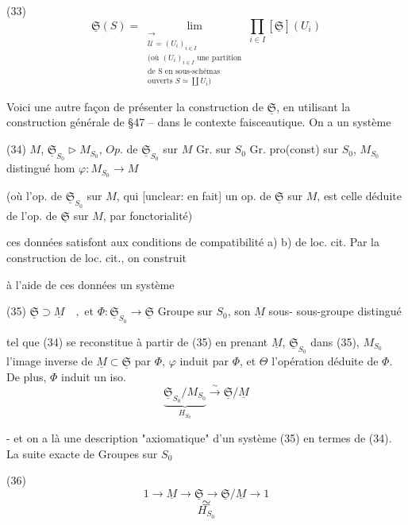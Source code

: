 (33) $$ \underline{\mathfrak{S}}(S) = \lim_{\substack{\longrightarrow \\ \mathcal{U} = (U_i)_{i \in I} \\ \text{(où } (U_i)_{i \in I} \text{ une partition} \\ \text{de S en sous-schémas} \\ \text{ouverts } S \simeq \coprod U_i)}} \prod_{i \in I} [\underline{\mathfrak{S}}](U_i) $$

Voici une autre façon de présenter la
construction de $\underline{\mathfrak{S}}$, en utilisant la
construction générale de §47 -- dans le
contexte faisceautique. On a un système

(34) $M$, $\underline{\mathfrak{S}}_{S_0} \triangleright M_{S_0}$, $Op.$ de $\underline{\mathfrak{S}}_{S_0}$ sur $M$
Gr. sur $S_0$  Gr. pro(const) sur $S_0$, $M_{S_0}$ distingué  hom $\varphi : M_{S_0} \to M$

(où l'op. de $\underline{\mathfrak{S}}_{S_0}$ sur $M$, qui [unclear: en fait]
un op. de $\underline{\mathfrak{S}}$ sur $M$, est celle déduite
de l'op. de $\underline{\mathfrak{S}}$ sur $M$, par fonctorialité)

ces données satisfont aux conditions de
compatibilité a) b) de loc. cit. Par la
construction de loc. cit., on construit

\newpage


à l'aide de ces données un système

(35) $\underline{\mathfrak{S}} \supset \underline{M} \quad , \text{ et } \Phi : \underline{\mathfrak{S}}_{S_0} \to \underline{\mathfrak{S}}$
Groupe sur $S_0$,
son $\underline{M}$ sous-
sous-groupe distingué

tel que (34) se reconstitue à partir de
(35) en prenant $\underline{M}$, $\underline{\mathfrak{S}}_{S_0}$ dans (35),
$M_{S_0}$ l'image inverse de $\underline{M} \subset \underline{\mathfrak{S}}$ par $\Phi$,
$\varphi$ induit par $\Phi$, et $\Theta$ l'opération déduite
de $\Phi$. De plus, $\Phi$ induit un iso.
$$ \underbrace{\underline{\mathfrak{S}}_{S_0} / M_{S_0}}_{H_{S_0}} \xrightarrow{\sim} \underline{\mathfrak{S}} / \underline{M} $$

- et on a là une description "axiomatique"
d'un système (35) en termes de (34).
La suite exacte de Groupes sur $S_0$

(36) $$ 1 \to \underline{M} \to \underline{\mathfrak{S}} \to \underline{\mathfrak{S}} / \underline{M} \to 1 $$
$$ \simeq $$
$$ H_{S_0} $$

